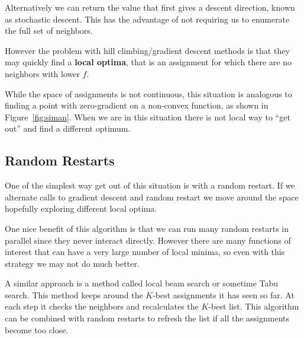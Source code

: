 \documentclass[11pt]{article}
\begin{document}
Alternatively we can return the value that first gives a descent direction, 
known as stochastic descent. This has the advantage of not requiring us
to enumerate the full set of neighbors.

\begin{algorithm}[h]
\begin{algorithmic}[1]
    
  \EndIf{}
  \EndFor{}
  \EndProcedure{}
\end{algorithmic}
\end{algorithm}

However the problem with hill climbing/gradient descent methods is that they may quickly find a \textbf{local optima}, that is an assignment for which there are no neighbors with lower $f$. 

While the space of assignments is not continuous, this situation is analogous to finding a point with zero-gradient on a non-convex function, as shown in Figure~\ref{fig:siman}. When we are in this situation there is not local way to ``get out'' and find a different optimum. 

\subsection{Random Restarts}

One of the simplest way get out of this situation is with a random restart. If we alternate calls to gradient descent and random restart we move around the space hopefully exploring different local optima. 

\begin{algorithm}[h]
\begin{algorithmic}[1]
    
  \EndIf{}
  \EndProcedure{}
\end{algorithmic}
\end{algorithm}

One nice benefit of this algorithm is that we can run many random restarts in parallel since they never interact directly. However there are many functions of interest that can have a very large number of local minima, so even with this strategy we may not do much better.    

A similar approach is a method called local beam search or sometime Tabu search. This method keeps around the $K$-best assignments it has seen so far. At each step it checks the neighbors and recalculates the $K$-best list.   This algorithm can be combined with random restarts to refresh the list if all the assignments become too close.   
\end{document}
